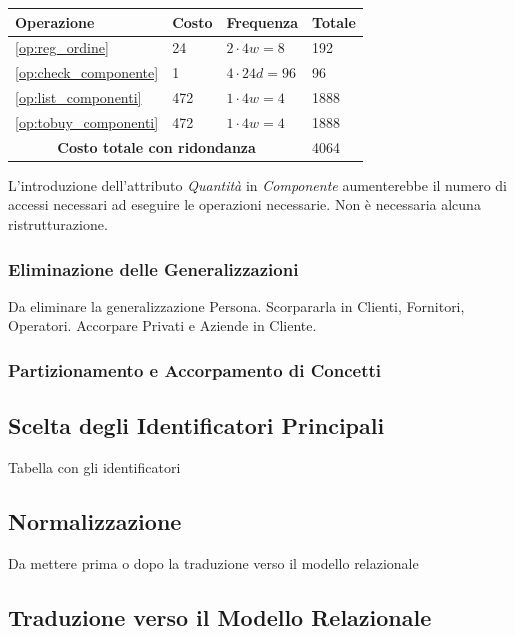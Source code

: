 					\begin{tabular}{| p{3cm} | p{3cm} | p{3cm} | p{3cm} |}
						\hline
						\textbf{Operazione} & \textbf{Costo} & \textbf{Frequenza} & \textbf{Totale} \\ \hline
						\ref{op:reg_ordine}			& 24	& $2 \cdot 4w = 8$		& 192 	\\
						\ref{op:check_componente}	& 1 	& $4 \cdot 24d = 96$	& 96	\\
						\ref{op:list_componenti}	& 472	& $1 \cdot 4w = 4$		& 1888	\\ 
						\ref{op:tobuy_componenti}	& 472	& $1 \cdot 4w = 4$		& 1888	\\
						\hline
						\multicolumn{3}{|c|}{\textbf{Costo totale con ridondanza}} & 4064 \\
						\hline
					\end{tabular}
					\vspace{2ex}

					L'introduzione dell'attributo \emph{Quantità} in \emph{Componente} aumenterebbe il numero di accessi necessari ad eseguire le operazioni necessarie. Non è necessaria alcuna ristrutturazione.

		\subsubsection{Eliminazione delle Generalizzazioni}
			
			Da eliminare la generalizzazione Persona. Scorpararla in Clienti, Fornitori, Operatori. Accorpare Privati e Aziende in Cliente.
			
		\subsubsection{Partizionamento e Accorpamento di Concetti}
	\subsection{Scelta degli Identificatori Principali}
		
		Tabella con gli identificatori
		
	\subsection{Normalizzazione}
		Da mettere prima o dopo la traduzione verso il modello relazionale
	\subsection{Traduzione verso il Modello Relazionale}

